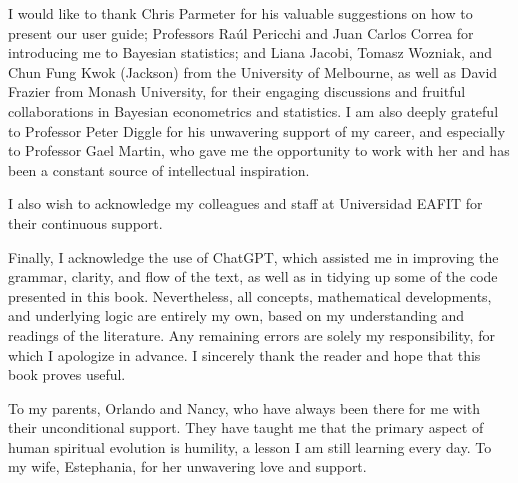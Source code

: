 I would like to thank Chris Parmeter for his valuable suggestions on how to present our user guide; Professors Raúl Pericchi and Juan Carlos Correa for introducing me to Bayesian statistics; and Liana Jacobi, Tomasz Wozniak, and Chun Fung Kwok (Jackson) from the University of Melbourne, as well as David Frazier from Monash University, for their engaging discussions and fruitful collaborations in Bayesian econometrics and statistics. I am also deeply grateful to Professor Peter Diggle for his unwavering support of my career, and especially to Professor Gael Martin, who gave me the opportunity to work with her and has been a constant source of intellectual inspiration.  

I also wish to acknowledge my colleagues and staff at Universidad EAFIT for their continuous support.  

Finally, I acknowledge the use of ChatGPT, which assisted me in improving the grammar, clarity, and flow of the text, as well as in tidying up some of the code presented in this book. Nevertheless, all concepts, mathematical developments, and underlying logic are entirely my own, based on my understanding and readings of the literature. Any remaining errors are solely my responsibility, for which I apologize in advance. I sincerely thank the reader and hope that this book proves useful.  

To my parents, Orlando and Nancy, who have always been there for me with their unconditional support. They have taught me that the primary aspect of human spiritual evolution is humility, a lesson I am still learning every day. To my wife, Estephania, for her unwavering love and support.






